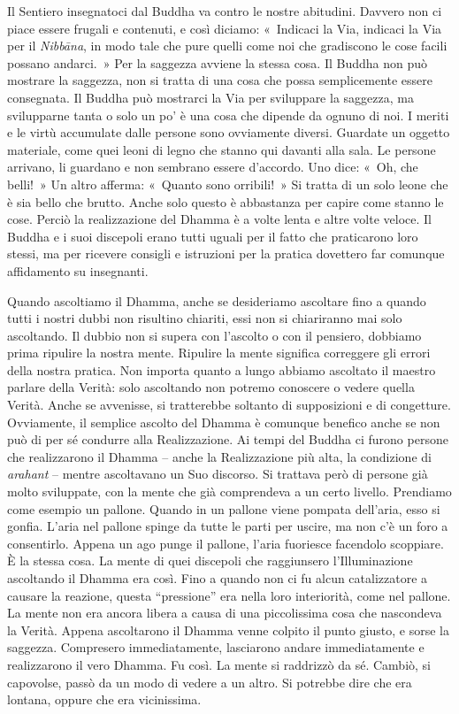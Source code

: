 Il Sentiero insegnatoci dal Buddha va contro le nostre abitudini.
Davvero non ci piace essere frugali e contenuti, e così diciamo:
«~Indicaci la Via, indicaci la Via per il \emph{Nibbāna}, in modo tale
che pure quelli come noi che gradiscono le cose facili possano
andarci.~» Per la saggezza avviene la stessa cosa. Il Buddha non può
mostrare la saggezza, non si tratta di una cosa che possa semplicemente
essere consegnata. Il Buddha può mostrarci la Via per sviluppare la
saggezza, ma svilupparne tanta o solo un po' è una cosa che dipende da
ognuno di noi. I meriti e le virtù accumulate dalle persone sono
ovviamente diversi. Guardate un oggetto materiale, come quei leoni di
legno che stanno qui davanti alla sala. Le persone arrivano, li guardano
e non sembrano essere d'accordo. Uno dice: «~Oh, che belli!~» Un altro
afferma: «~Quanto sono orribili!~» Si tratta di un solo leone che è sia
bello che brutto. Anche solo questo è abbastanza per capire come stanno
le cose. Perciò la realizzazione del Dhamma è a volte lenta e altre
volte veloce. Il Buddha e i suoi discepoli erano tutti uguali per il
fatto che praticarono loro stessi, ma per ricevere consigli e istruzioni
per la pratica dovettero far comunque affidamento su insegnanti.

Quando ascoltiamo il Dhamma, anche se desideriamo ascoltare fino a
quando tutti i nostri dubbi non risultino chiariti, essi non si
chiariranno mai solo ascoltando. Il dubbio non si supera con l'ascolto o
con il pensiero, dobbiamo prima ripulire la nostra mente. Ripulire la
mente significa correggere gli errori della nostra pratica. Non importa
quanto a lungo abbiamo ascoltato il maestro parlare della Verità: solo
ascoltando non potremo conoscere o vedere quella Verità. Anche se
avvenisse, si tratterebbe soltanto di supposizioni e di congetture.
Ovviamente, il semplice ascolto del Dhamma è comunque benefico anche se
non può di per sé condurre alla Realizzazione. Ai tempi del Buddha ci
furono persone che realizzarono il Dhamma -- anche la Realizzazione più
alta, la condizione di \emph{arahant} -- mentre ascoltavano un Suo
discorso. Si trattava però di persone già molto sviluppate, con la mente
che già comprendeva a un certo livello. Prendiamo come esempio un
pallone. Quando in un pallone viene pompata dell'aria, esso si gonfia.
L'aria nel pallone spinge da tutte le parti per uscire, ma non c'è un
foro a consentirlo. Appena un ago punge il pallone, l'aria fuoriesce
facendolo scoppiare. È la stessa cosa. La mente di quei discepoli che
raggiunsero l'Illuminazione ascoltando il Dhamma era così. Fino a quando
non ci fu alcun catalizzatore a causare la reazione, questa
``pressione'' era nella loro interiorità, come nel pallone. La mente non
era ancora libera a causa di una piccolissima cosa che nascondeva la
Verità. Appena ascoltarono il Dhamma venne colpito il punto giusto, e
sorse la saggezza. Compresero immediatamente, lasciarono andare
immediatamente e realizzarono il vero Dhamma. Fu così. La mente si
raddrizzò da sé. Cambiò, si capovolse, passò da un modo di vedere a un
altro. Si potrebbe dire che era lontana, oppure che era vicinissima.

